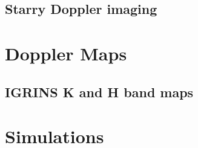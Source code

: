 \documentclass[twocolumn]{aastex631}
\begin{document}
\subsection{Starry Doppler imaging}


\section{Doppler Maps}

\subsection{IGRINS K and H band maps}

\iffalse
\begin{figure*}
    \script{doppler_imaging.py}
    \centering
    \begin{minipage}[b]{0.18\textwidth}
        \centering
        \texttt{[image: figures/solver1.pdf]}
        \label{fig:solver1}
     \end{minipage}
     \hfill
     \begin{minipage}[b]{0.18\textwidth}
         \centering
         \texttt{[image: figures/solver2.pdf]}
         \label{fig:solver2}
     \end{minipage}
     \hfill
     \begin{minipage}[b]{0.18\textwidth}
         \centering
         \texttt{[image: figures/solver3.pdf]}
         \label{fig:solver3}
     \end{minipage}
     \hfill
     \begin{minipage}[b]{0.18\textwidth}
         \centering
         \texttt{[image: figures/solver4.pdf]}
         \label{fig:solver4}
     \end{minipage}
     \hfill
     \begin{minipage}[b]{0.18\textwidth}
         \centering
         \texttt{[image: figures/solver5.pdf]}
         \label{fig:solver5}
     \end{minipage}
\end{figure*} 
\fi

\section{Simulations}
\end{document}
